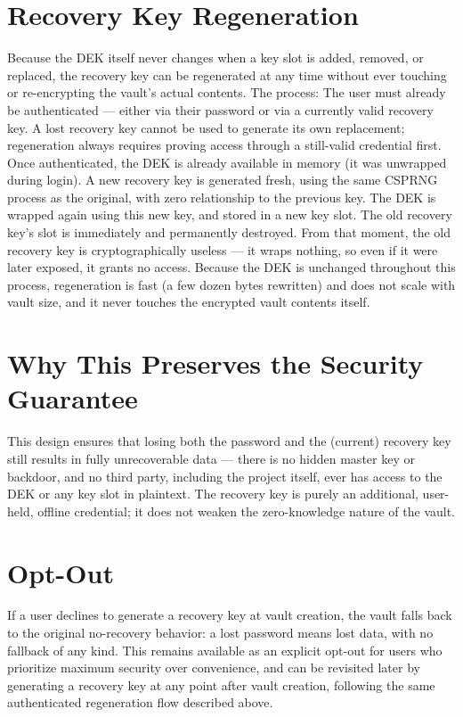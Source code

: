 \section{Recovery Key Regeneration}
Because the DEK itself never changes when a key slot is added, removed, or replaced, the recovery key can be regenerated at any time without ever touching or re-encrypting the vault's actual contents. The process:
The user must already be authenticated — either via their password or via a currently valid recovery key. A lost recovery key cannot be used to generate its own replacement; regeneration always requires proving access through a still-valid credential first.
Once authenticated, the DEK is already available in memory (it was unwrapped during login).
A new recovery key is generated fresh, using the same CSPRNG process as the original, with zero relationship to the previous key.
The DEK is wrapped again using this new key, and stored in a new key slot.
The old recovery key's slot is immediately and permanently destroyed. From that moment, the old recovery key is cryptographically useless — it wraps nothing, so even if it were later exposed, it grants no access.
Because the DEK is unchanged throughout this process, regeneration is fast (a few dozen bytes rewritten) and does not scale with vault size, and it never touches the encrypted vault contents itself.

\section{Why This Preserves the Security Guarantee}
This design ensures that losing both the password and the (current) recovery key still results in fully unrecoverable data — there is no hidden master key or backdoor, and no third party, including the project itself, ever has access to the DEK or any key slot in plaintext. The recovery key is purely an additional, user-held, offline credential; it does not weaken the zero-knowledge nature of the vault.

\section{Opt-Out}
If a user declines to generate a recovery key at vault creation, the vault falls back to the original no-recovery behavior: a lost password means lost data, with no fallback of any kind. This remains available as an explicit opt-out for users who prioritize maximum security over convenience, and can be revisited later by generating a recovery key at any point after vault creation, following the same authenticated regeneration flow described above.

\sentinelchapterend
